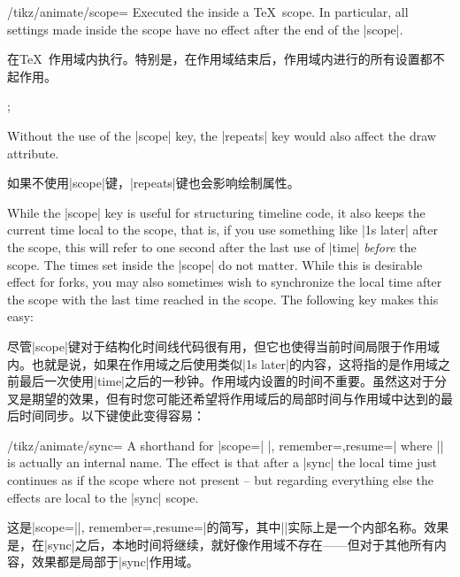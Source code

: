 \begin{key}{/tikz/animate/scope=}
    Executed the  inside a \TeX\ scope. In particular, all
    settings made inside the scope have no effect after the end of the |scope|.
    
    在\TeX\ 作用域内执行。特别是，在作用域结束后，作用域内进行的所有设置都不起作用。


\begin{codeexample}[
    preamble={\usetikzlibrary{animations}},
    animation list={0.5,1,1.5,2},
]
\tikz {};
\end{codeexample}

    Without the use of the |scope| key, the |repeats| key would also affect the
    draw attribute.

    如果不使用|scope|键，|repeats|键也会影响绘制属性。


\end{key}

While the |scope| key is useful for structuring timeline code, it also keeps
the current time local to the scope, that is, if you use something like
|1s later| after the scope, this will refer to one second after the last use of
|time| \emph{before} the scope. The times set inside the |scope| do not matter.
While this is desirable effect for forks, you may also sometimes wish to
synchronize the local time after the scope with the last time reached in the
scope. The following key makes this easy:

尽管|scope|键对于结构化时间线代码很有用，但它也使得当前时间局限于作用域内。也就是说，如果在作用域之后使用类似|1s later|的内容，这将指的是作用域之前最后一次使用|time|之后的一秒钟。作用域内设置的时间不重要。虽然这对于分叉是期望的效果，但有时您可能还希望将作用域后的局部时间与作用域中达到的最后时间同步。以下键使此变得容易：


\begin{key}{/tikz/animate/sync=}
    A shorthand for |scope={|  |, remember=\temp},resume=\temp|
    where |\temp| is actually an internal name. The effect is that after a
    |sync| the local time just continues as if the scope where not present --
    but regarding everything else the effects are local to the |sync| scope.

    这是|scope={||, remember=\temp},resume=\temp|的简写，其中|\temp|实际上是一个内部名称。效果是，在|sync|之后，本地时间将继续，就好像作用域不存在——但对于其他所有内容，效果都是局部于|sync|作用域。


\end{key}


